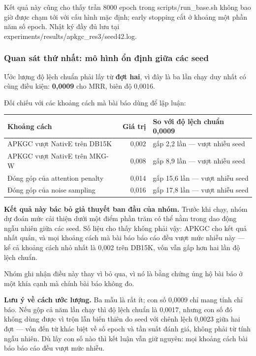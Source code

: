 \documentclass[11pt,a4paper]{article}
\newcommand{\code}[1]{{\ttfamily\small\color{codetext}#1}}
\begin{document}
Kết quả này cũng cho thấy trần 8000 epoch trong \code{scripts/run\_base.sh} không bao giờ được chạm tới với cấu hình mặc định; early stopping cắt ở khoảng một phần năm số epoch. Nhật ký đầy đủ lưu tại \code{experiments/results/apkgc\_res3/seed42.log}.

\subsubsection{Quan sát thứ nhất: mô hình ổn định giữa các seed}
Ước lượng độ lệch chuẩn phải lấy từ \textbf{đợt hai}, vì đây là ba lần chạy duy nhất có cùng điều kiện: \textbf{0,0009} cho MRR, biên độ 0,0016.

Đối chiếu với các khoảng cách mà bài báo dùng để lập luận:

\begin{center}\small
\begin{tabular}{@{}lrl@{}}
\toprule
\textbf{Khoảng cách} & \textbf{Giá trị} & \textbf{So với độ lệch chuẩn 0,0009}\\
\midrule
APKGC vượt NativE trên DB15K & 0,002 & gấp 2,2 lần --- vượt nhiễu seed\\
APKGC vượt NativE trên MKG-W & 0,008 & gấp 8,9 lần --- vượt nhiễu seed\\
Đóng góp của attention penalty & 0,014 & gấp 15,6 lần --- vượt nhiễu seed\\
Đóng góp của noise sampling & 0,016 & gấp 17,8 lần --- vượt nhiễu seed\\
\bottomrule
\end{tabular}
\end{center}
\textbf{Kết quả này bác bỏ giả thuyết ban đầu của nhóm.} Trước khi chạy, nhóm dự đoán mức cải thiện dưới một điểm phần trăm có thể nằm trong dao động ngẫu nhiên giữa các seed. Số liệu cho thấy không phải vậy: APKGC cho kết quả nhất quán, và mọi khoảng cách mà bài báo báo cáo đều vượt mức nhiễu này --- kể cả khoảng cách nhỏ nhất là 0,002 trên DB15K, vốn vẫn gấp hơn hai lần độ lệch chuẩn.

Nhóm ghi nhận điều này thay vì bỏ qua, vì nó là bằng chứng ủng hộ bài báo ở một khía cạnh mà chính bài báo không đo.

\textbf{Lưu ý về cách ước lượng.} Ba mẫu là rất ít; con số 0,0009 chỉ mang tính chỉ báo. Nếu gộp cả năm lần chạy thì độ lệch chuẩn là 0,0017, nhưng con số đó không dùng được vì trộn lẫn biến thiên do seed với chênh lệch 0,0023 giữa hai đợt --- vốn đến từ khác biệt về số epoch và tần suất đánh giá, không phải từ tính ngẫu nhiên. Dù lấy con số nào thì kết luận vẫn giữ nguyên: mọi khoảng cách bài báo báo cáo đều vượt mức nhiễu.
\end{document}
